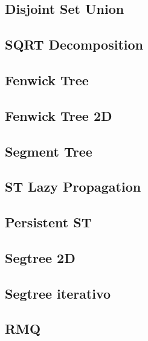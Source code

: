 \subsection{Disjoint Set Union}
\raggedbottom
\hrulefill
\subsection{SQRT Decomposition}
\raggedbottom
\hrulefill
\subsection{Fenwick Tree}
\raggedbottom
\hrulefill
\subsection{Fenwick Tree 2D}
\raggedbottom
\hrulefill
\subsection{Segment Tree}
\raggedbottom
\hrulefill
\subsection{ST Lazy Propagation}
\raggedbottom
\hrulefill
\subsection{Persistent ST}
\raggedbottom
\hrulefill
\subsection{Segtree 2D}
\raggedbottom
\hrulefill
\subsection{Segtree iterativo}
\raggedbottom
\hrulefill
\subsection{RMQ}
\raggedbottom
\hrulefill

